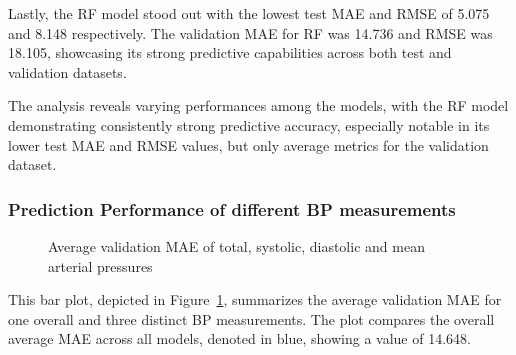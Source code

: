 Lastly, the RF model stood out with the lowest test MAE and RMSE of 5.075 and 8.148 respectively.
The validation MAE for RF was 14.736 and RMSE was 18.105, showcasing its strong predictive capabilities across both test and validation datasets.

The analysis reveals varying performances among the models, with the RF model demonstrating consistently strong predictive accuracy,
especially notable in its lower test MAE and RMSE values, but only average metrics for the validation dataset.

\subsubsection{Prediction Performance of different BP measurements}
\label{subsubsec:bp_prediction_performance}

\begin{figure}[h]
    \centering
    \captionsetup{format=plain, justification=centering, font=small}
    \caption{Average validation MAE of total, systolic, diastolic and mean arterial pressures}
    \label{fig:all_mae}
\end{figure}

This bar plot, depicted in Figure~\ref{fig:all_mae}, summarizes the average validation MAE for one overall and three distinct BP measurements.
The plot compares the overall average MAE across all models, denoted in blue, showing a value of 14.648.

